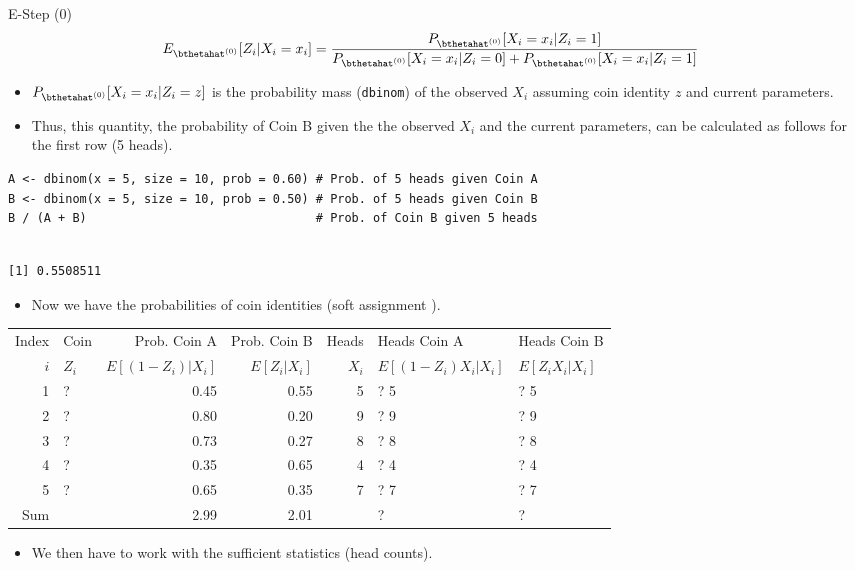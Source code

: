 \documentclass[dvipdfmx,bigger,aspectratio=169]{beamer}
\begin{document}
\begin{frame}[fragile,allowframebreaks,label=,t]{E-Step (0)}
\newpage
\footnotesize
\begin{align*}
  E_{\bthetahat^{(0)}}[Z_{i} | X_{i} = x_{i}]
  &= \frac{P_{\bthetahat^{(0)}}[X_{i} = x_{i} | Z_{i} = 1]}
          {P_{\bthetahat^{(0)}}[X_{i} = x_{i} | Z_{i} = 0] + P_{\bthetahat^{(0)}}[X_{i} = x_{i} | Z_{i} = 1]}
\end{align*}
\normalsize
\begin{itemize}
\item \(P_{\bthetahat^{(0)}}[X_{i} = x_{i} | Z_{i} = z]\) is the probability mass (\texttt{dbinom}) of the observed \(X_{i}\) assuming coin identity \(z\) and current parameters.
\item Thus, this quantity, the probability of Coin B given the the observed \(X_{i}\) and the current parameters, can be calculated as follows for the first row (5 heads).
\end{itemize}
\scriptsize
\begin{verbatim}
A <- dbinom(x = 5, size = 10, prob = 0.60) # Prob. of 5 heads given Coin A
B <- dbinom(x = 5, size = 10, prob = 0.50) # Prob. of 5 heads given Coin B
B / (A + B)                                # Prob. of Coin B given 5 heads
\end{verbatim}

\begin{verbatim}

[1] 0.5508511
\end{verbatim}


\normalsize

\newpage
\begin{itemize}
\item Now we have the probabilities of coin identities (soft assignment \cite{hastieElementsStatisticalLearning2016}).
\end{itemize}
\footnotesize
\begin{center}
\begin{tabular}{r|l|rr|r|ll|}
Index & Coin & Prob. Coin A & Prob. Coin B & Heads & Heads Coin A & Heads Coin B\\
\(i\) & \(Z_{i}\) & \(E[(1-Z_{i})\vert X_{i}]\) & \(E[Z_{i}\vert X_{i}]\) & \(X_{i}\) & \(E[(1-Z_{i}) X_{i} \vert X_{i}]\) & \(E[Z_{i} X_{i} \vert X_{i}]\)\\
\hline
1 & ? & 0.45 & 0.55 & 5 & ? \texttimes{} 5 & ? \texttimes{} 5\\
2 & ? & 0.80 & 0.20 & 9 & ? \texttimes{} 9 & ? \texttimes{} 9\\
3 & ? & 0.73 & 0.27 & 8 & ? \texttimes{} 8 & ? \texttimes{} 8\\
4 & ? & 0.35 & 0.65 & 4 & ? \texttimes{} 4 & ? \texttimes{} 4\\
5 & ? & 0.65 & 0.35 & 7 & ? \texttimes{} 7 & ? \texttimes{} 7\\
\hline
Sum &  & 2.99 & 2.01 &  & ? & ?\\
\end{tabular}
\end{center}
\normalsize
\begin{itemize}
\item We then have to work with the sufficient statistics (head counts).
\end{itemize}


\end{frame}
\end{document}
